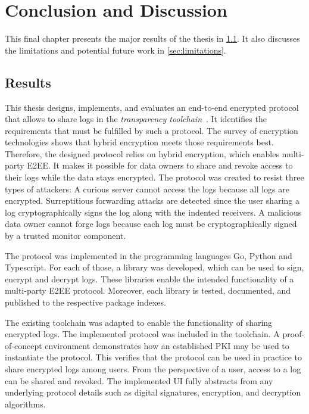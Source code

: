 \documentclass[../main.tex]{subfiles}
\begin{document}
\chapter{Conclusion and Discussion}
\label{chap:conclusion}

This final chapter presents the major results of the thesis in \cref{sec:result}.
It also discusses the limitations and potential future work in \cref{sec:limitations}.

\section{Results}
\label{sec:result}

This thesis designs, implements, and evaluates an end-to-end encrypted protocol that allows to share logs in the \emph{transparency toolchain}~\cite{Zieglmeier2021}.
It identifies the requirements that must be fulfilled by such a protocol.
The survey of encryption technologies shows that hybrid encryption meets those requirements best.
Therefore, the designed protocol relies on hybrid encryption, which enables multi-party E2EE.
It makes it possible for data owners to share and revoke access to their logs while the data stays encrypted.
The protocol was created to resist three types of attackers: 
A curious server cannot access the logs because all logs are encrypted.
Surreptitious forwarding attacks are detected since the user sharing a log cryptographically signs the log along with the indented receivers.
A malicious data owner cannot forge logs because each log must be cryptographically signed by a trusted monitor component.

The protocol was implemented in the programming languages Go, Python and Typescript.
For each of those, a library was developed, which can be used to sign, encrypt and decrypt logs.
These libraries enable the intended functionality of a multi-party E2EE protocol.
Moreover, each library is tested, documented, and published to the respective package indexes.

The existing toolchain was adapted to enable the functionality of sharing encrypted logs.
The implemented protocol was included in the toolchain.
A proof-of-concept environment demonstrates how an established PKI may be used to instantiate the protocol.
This verifies that the protocol can be used in practice to share encrypted logs among users.
From the perspective of a user, access to a log can be shared and revoked.
The implemented UI fully abstracts from any underlying protocol details such as digital signatures, encryption, and decryption algorithms.
\end{document}
